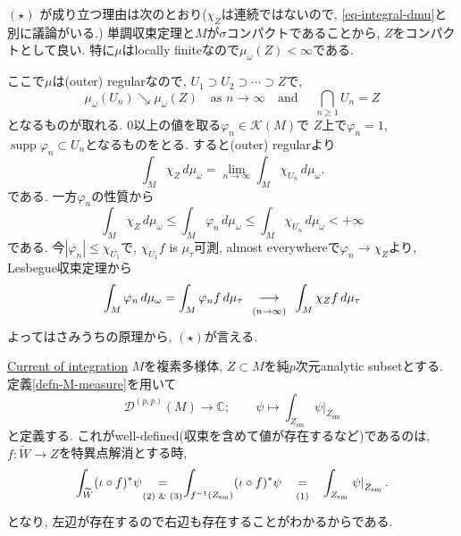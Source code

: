 $(\star)$ が成り立つ理由は次のとおり($\chi_Z$は連続ではないので, \eqref{eq-integral-dmu}と別に議論がいる.)
単調収束定理と$M$が$\sigma$コンパクトであることから, 
$Z$をコンパクトとして良い.
特に$\mu$はlocally finiteなので$\mu_\omega(Z)<\infty$である. 

ここで$\mu$は(outer) regularなので, $U_1\supset U_2\supset\cdots\supset Z$で, 
\begin{equation*}
\mu_\omega(U_n)\searrow\mu_\omega(Z)
\quad\text{as }n\to\infty
\quad
\text{and }
\quad
\bigcap_{n\geq 1}U_n=Z
\end{equation*}
となるものが取れる. 
0以上の値を取る$\varphi_n\in\mathcal{K}(M)$で
$Z$上で$\varphi_n=1$, 
$\operatorname{supp}\varphi_n\subset U_n$となるものをとる. 
すると(outer) regularより
\begin{equation*}
\int_M\chi_Z\,d\mu_\omega
=
\lim_{n\to\infty}\int_M\chi_{U_n}\,d\mu_\omega.
\end{equation*}
である. 
一方$\varphi_n$の性質から
\begin{equation*}
\int_M\chi_Z\,d\mu_\omega
\leq
\int_M\varphi_n\,d\mu_\omega
\leq
\int_M\chi_{U_n}\,d\mu_\omega<+\infty
\end{equation*}
である. 今$|\varphi_n|\leq\chi_{\overline{U_1}}$で,  $\chi_{\overline{U_1}}f$ is $\mu_\tau$可測, almost everywhereで$\varphi_n\to\chi_Z$より, 
Lesbegue収束定理から
$$
\int_M\varphi_n\,d\mu_\omega
=
\int_M\varphi_n f\,d\mu_\tau
\underalign{(n\to\infty)}{\longrightarrow}
\int_M\chi_Z f\,d\mu_\tau
$$
よってはさみうちの原理から, $(\star)$が言える. 

\underline{Current of integration}
 $M$を複素多様体, $Z\subset M$を純$p$次元analytic subsetとする. 
 定義\ref{defn-M-measure}を用いて
\begin{equation*}
\mathcal{D}^{(p,p)}(M)\longrightarrow\mathbb{C};
\qquad
\psi\longmapsto
\int_{Z_{\mathrm{sm}}}\left.\psi\right|_{Z_{\mathrm{sm}}}
\end{equation*}
と定義する. これがwell-defined(収束を含めて値が存在するなど)であるのは, 
$f : \widetilde{W} \to Z$を特異点解消とする時, 
\begin{equation*}
\int_{\widetilde{W}}(\iota\circ f)^*\psi
\underalign{\text{(2) \& (3)}}{=}
\int_{f^{-1}(Z_{\mathrm{sm}})}(\iota\circ f)^*\psi
\underalign{\text{(1)}}{=}
\int_{Z_{\mathrm{sm}}}\left.\psi\right|_{Z_{\mathrm{sm}}}.
\end{equation*}
となり, 左辺が存在するので右辺も存在することがわかるからである. 








